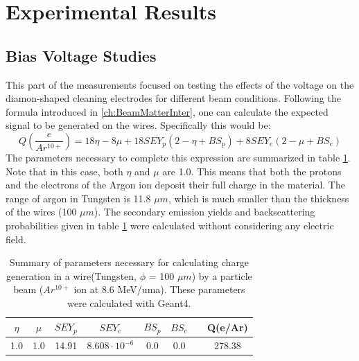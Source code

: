 \section{Experimental Results}

\subsection{Bias Voltage Studies}
\label{sec:BiasVoltage}

This part of the measurements focused on testing the effects of the voltage on the diamon-shaped cleaning electrodes for different beam conditions. Following the formula introduced in \ref{ch:BeamMatterInter}, one can calculate the expected signal to be generated on the wires. Specifically this would be:
\begin{equation}
    Q\left(\frac{e}{Ar^{10+}}\right) = 18\eta - 8 \mu + 18SEY_{p}\left( 2 - \eta + BS_{p}\right) + 8SEY_{e}\left(2 - \mu + BS_{e}\right)
\end{equation}
The parameters necessary to complete this expression are summarized in table \ref{tab:CurrentParAr10}. Note that in this case, both $\eta$ and $\mu$ are 1.0. This means that both the protons and the electrons of the Argon ion deposit their full charge in the material. The range of argon in Tungsten is 11.8 $\mu m$, which is much smaller than the thickness of the wires (100 $\mu m$). The secondary emission yields and backscattering probabilities given in table \ref{tab:CurrentParAr10} were calculated without considering any electric field. 
\begin{table}[h]
    \centering
    \begin{tabular}{cccccccc}
    \hline
    $\eta$ & $\mu$ & $SEY_p$ & $SEY_e$ & $BS_p$ & $BS_e$ & & Q(e/Ar) \\ \hline
      1.0  &  1.0  &  14.91    &  $8.608\cdot 10^{-6}$   & 0.0    &  0.0 & & 278.38  \\ \hline
    \end{tabular}
    \caption{Summary of parameters necessary for calculating charge generation in a wire(Tungsten, $\phi $ = 100 $\mu m$) by a particle beam ($Ar^{10+}$ ion at 8.6 MeV/uma). These parameters were calculated with Geant4.}
    \label{tab:CurrentParAr10}
\end{table}

